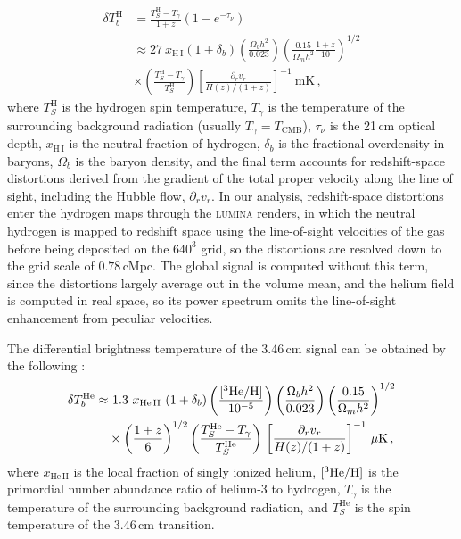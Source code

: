 \documentclass[apj,twocolumn, appendixfloats, twocolappendix, numberedappendix, tighten]{openjournal}
\DeclareRobustCommand{\lumina}{\mbox{\textsc{lumina}}\xspace}
\begin{document}
\begin{equation}
    \begin{split}
        \delta T^{\mathrm{H}}_b & =  \frac{T^\mathrm{H}_S - T_\gamma}{1+z} \left(1 - e^{-\tau_\nu} \right) \\
        & \approx 27 \ x_{\mathrm{H\,I}} (1+\delta_b)\left( \frac{\Omega_b h^2}{0.023} \right) \left( \frac{0.15}{\Omega_m h^2} \frac{1+z}{10} \right)^{1/2}  \\
        & \times \left( \frac{T^\mathrm{H}_S - T_\gamma}{T^\mathrm{H}_S} \right) \left[ \frac{\partial_r v_r}{H(z)/(1+z)} \right]^{-1} \ \text{mK} \, ,
    \end{split} \label{eq:21cm}
\end{equation}
where $T^\mathrm{H}_S$ is the hydrogen spin temperature, $T_\gamma$ is the temperature of the surrounding background radiation (usually $T_\gamma = T_\mathrm{CMB}$), $\tau_\nu$ is the 21\,cm optical depth, $x_{\mathrm{H\,I}}$ is the neutral fraction of hydrogen, $\delta_b$ is the fractional overdensity in baryons, $\Omega_b$ is the baryon density, and the final term accounts for redshift-space distortions derived from the gradient of the total proper velocity along the line of sight, including the Hubble flow, $\partial_r v_r$. In our analysis, redshift-space distortions enter the hydrogen maps through the \lumina renders, in which the neutral hydrogen is mapped to redshift space using the line-of-sight velocities of the gas before being deposited on the $640^3$ grid, so the distortions are resolved down to the grid scale of $0.78$\,cMpc. The global signal is computed without this term, since the distortions largely average out in the volume mean, and the helium field is computed in real space, so its power spectrum omits the line-of-sight enhancement from peculiar velocities.

The differential brightness temperature of the 3.46\,cm  signal can be obtained by the following \citep[][]{Furlanetto2006}:
\begin{equation}
    \begin{split}
        \delta T^{\mathrm{He}}_{b} \approx &
         \ 1.3 \ x_\mathrm{He\,II} \ (1+\delta_b)  \left(\frac{[^3{\rm He}/{\rm H}]}{10^{-5}}\right)  \left( \frac{\Omega_b h^2}{0.023} \right) \left( \frac{0.15}{\Omega_m h^2} \right)^{1/2}  \\
        & \times \left( \frac{1+z}{6}\right)^{1/2}\left( \frac{T^\mathrm{He}_S - T_\gamma}{T^\mathrm{He}_S} \right) \,
        \left[ \frac{\partial_r v_r}{H(z)/(1+z)} \right]^{-1} \, \mu\mathrm{K}\,,
    \end{split} \label{eq:helium}
\end{equation}
where $x_\mathrm{He\,II}$ is the local fraction of singly ionized helium, $[^3{\rm He}/{\rm H}]$ is the primordial number abundance ratio of helium-3 to hydrogen, $T_\gamma$ is the temperature of the surrounding background radiation, and $T^\mathrm{He}_S$ is the spin temperature of the 3.46\,cm transition.
\end{document}
